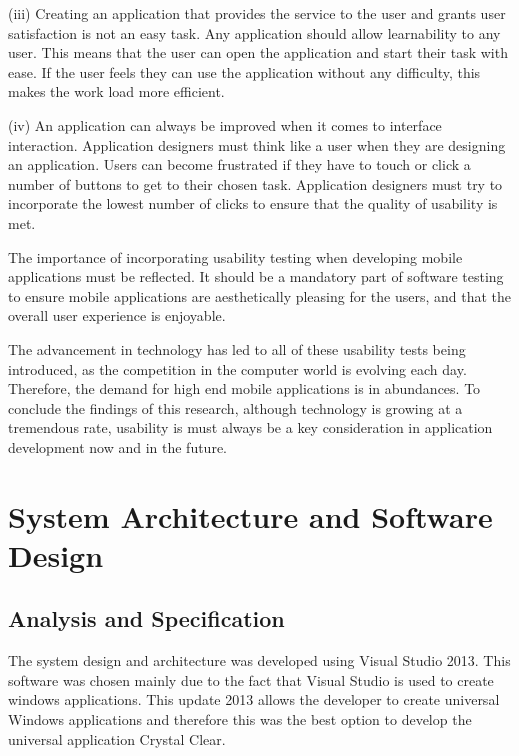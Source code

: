 \documentclass[runningheads,a4paper]{llncs}
\begin{document}
\begin{inparaenum}[]
(iii) Creating an application that provides the service to the user and grants user satisfaction is not an easy task. Any application should allow learnability to any user. This means that the user can open the application and start their task with ease. If the user feels they can use the application without any difficulty, this makes the work load more efficient.
\end{inparaenum}

\begin{inparaenum}[]
(iv)  An application can always be improved when it comes to interface interaction. Application designers must think like a user when they are designing an application. Users can become frustrated if they have to touch or click a number of buttons to get to their chosen task. Application designers must try to incorporate the lowest number of clicks to ensure that the quality of usability is met.
\cite{martinazzo2008testing}
\end{inparaenum}

\begin{inparaenum}[]
The importance of incorporating usability testing when developing mobile applications must be reflected. It should be a mandatory part of software testing to ensure mobile applications are aesthetically pleasing for the users, and that the overall user experience is enjoyable.
\end{inparaenum}

\begin{inparaenum}[]
The advancement in technology has led to all of these usability tests being introduced, as the competition in the computer world is evolving each day. Therefore, the demand for high end mobile applications is in abundances. To conclude the findings of this research, although technology is growing at a tremendous rate, usability is must always be a key consideration in application development now and in the future. 
\end{inparaenum}

\section{System Architecture and Software Design}
\subsection{Analysis and Specification}
The system design and architecture was developed using Visual Studio 2013. This software was chosen mainly due to the fact that Visual Studio is used to create windows applications. This update 2013 allows the developer to create universal Windows applications and therefore this was the best option to develop the universal application Crystal Clear.
\end{document}
